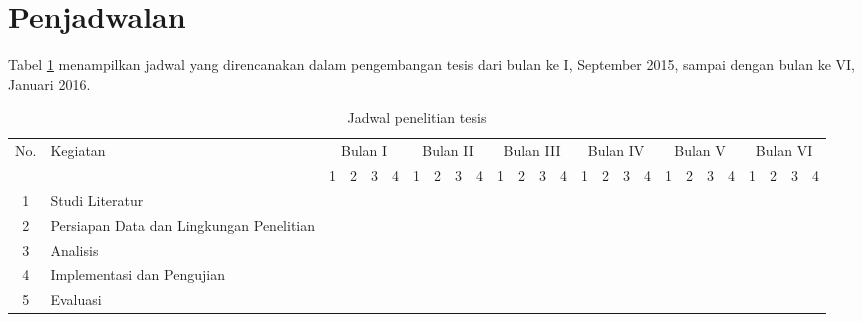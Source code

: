 \section{Penjadwalan}\label{sec:penjadwalan}

Tabel \ref{tab:jadwal} menampilkan jadwal yang direncanakan dalam pengembangan tesis dari bulan ke I, September 2015, sampai dengan bulan ke VI, Januari 2016.

\renewcommand{\arraystretch}{1.5}
\setlength{\tabcolsep}{3pt}

\begin{table}[h!]
	\centering
	{\footnotesize
	\begin{tabular}{|c|p{3cm}|c|c|c|c |c|c|c|c |c|c|c|c |c|c|c|c| |c|c|c|c |c|c|c|c|}
		\hline
		\multirow{2}{*}{No.}
			& \multirow{2}{*}{Kegiatan}
			& \multicolumn{4}{c|}{Bulan I}
			& \multicolumn{4}{c|}{Bulan II}
			& \multicolumn{4}{c|}{Bulan III}
			& \multicolumn{4}{c|}{Bulan IV}
			& \multicolumn{4}{c|}{Bulan V}
			& \multicolumn{4}{c|}{Bulan VI}\\
		\cline{3-26}
		& &
			1 & 2 & 3 & 4 &
			1 & 2 & 3 & 4 &
			1 & 2 & 3 & 4 &
			1 & 2 & 3 & 4 &
			1 & 2 & 3 & 4 &
			1 & 2 & 3 & 4\\
		\hline
		1 & Studi Literatur &
			{\cellcolor[gray]{0.7}} &
			{\cellcolor[gray]{0.7}} &
			{\cellcolor[gray]{0.7}} &
			{\cellcolor[gray]{0.7}} &
			& & & &
			& & & &
			& & & &
			& & & &
			& & & \\
		\hline
		2 & Persiapan Data dan Lingkungan Penelitian &
			& &
			{\cellcolor[gray]{0.7}} &
			{\cellcolor[gray]{0.7}} &
			{\cellcolor[gray]{0.7}} &
			{\cellcolor[gray]{0.7}} &
			& &
			& & & &
			& & & &
			& & & &
			& & & \\
		\hline
		3 & Analisis &
			& & & &
			{\cellcolor[gray]{0.7}} &
			{\cellcolor[gray]{0.7}} &
			{\cellcolor[gray]{0.7}} &
			{\cellcolor[gray]{0.7}} &
			{\cellcolor[gray]{0.7}} &
			{\cellcolor[gray]{0.7}} &
			& &
			& & & &
			& & & &
			& & & \\
		\hline
		4 & Implementasi dan Pengujian &
			& & & &
			& & & &
			{\cellcolor[gray]{0.7}} &
			{\cellcolor[gray]{0.7}} &
			{\cellcolor[gray]{0.7}} &
			{\cellcolor[gray]{0.7}} &
			{\cellcolor[gray]{0.7}} &
			{\cellcolor[gray]{0.7}} &
			{\cellcolor[gray]{0.7}} &
			{\cellcolor[gray]{0.7}} &
			{\cellcolor[gray]{0.7}} &
			{\cellcolor[gray]{0.7}} &
			{\cellcolor[gray]{0.7}} &
			{\cellcolor[gray]{0.7}} &
			{\cellcolor[gray]{0.7}} &
			{\cellcolor[gray]{0.7}} &
			{\cellcolor[gray]{0.7}} \\
		\hline
		5 & Evaluasi &
			& & & &
			& & & &
			& & & &
			& & & &
			& & & &
			& &
			{\cellcolor[gray]{0.7}} &
			{\cellcolor[gray]{0.7}} \\
		\hline
	\end{tabular}
	}
	\caption{Jadwal penelitian tesis}
	\label{tab:jadwal}
\end{table}